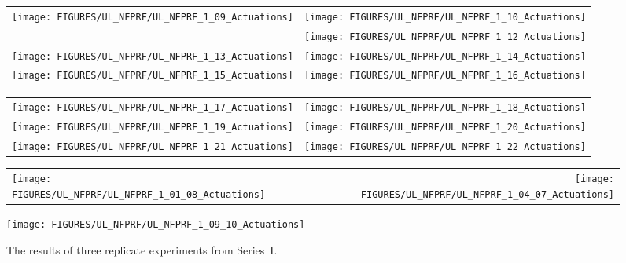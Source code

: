 \begin{figure}[p]
\begin{tabular*}{\textwidth}{l@{\extracolsep{\fill}}r}
\texttt{[image: FIGURES/UL\_NFPRF/UL\_NFPRF\_1\_09\_Actuations]} &
\texttt{[image: FIGURES/UL\_NFPRF/UL\_NFPRF\_1\_10\_Actuations]} \\
&
\texttt{[image: FIGURES/UL\_NFPRF/UL\_NFPRF\_1\_12\_Actuations]} \\
\texttt{[image: FIGURES/UL\_NFPRF/UL\_NFPRF\_1\_13\_Actuations]} &
\texttt{[image: FIGURES/UL\_NFPRF/UL\_NFPRF\_1\_14\_Actuations]} \\
\texttt{[image: FIGURES/UL\_NFPRF/UL\_NFPRF\_1\_15\_Actuations]} &
\texttt{[image: FIGURES/UL\_NFPRF/UL\_NFPRF\_1\_16\_Actuations]} \\
\end{tabular*}
\label{UL_NFPRF_2}
\end{figure}

\begin{figure}[p]
\begin{tabular*}{\textwidth}{l@{\extracolsep{\fill}}r}
\texttt{[image: FIGURES/UL\_NFPRF/UL\_NFPRF\_1\_17\_Actuations]} &
\texttt{[image: FIGURES/UL\_NFPRF/UL\_NFPRF\_1\_18\_Actuations]} \\
\texttt{[image: FIGURES/UL\_NFPRF/UL\_NFPRF\_1\_19\_Actuations]} &
\texttt{[image: FIGURES/UL\_NFPRF/UL\_NFPRF\_1\_20\_Actuations]} \\
\texttt{[image: FIGURES/UL\_NFPRF/UL\_NFPRF\_1\_21\_Actuations]} &
\texttt{[image: FIGURES/UL\_NFPRF/UL\_NFPRF\_1\_22\_Actuations]}
\end{tabular*}
\label{UL_NFPRF_3}
\end{figure}

\begin{figure}[p]
\begin{tabular*}{\textwidth}{l@{\extracolsep{\fill}}r}
\texttt{[image: FIGURES/UL\_NFPRF/UL\_NFPRF\_1\_01\_08\_Actuations]} &
\texttt{[image: FIGURES/UL\_NFPRF/UL\_NFPRF\_1\_04\_07\_Actuations]}
\end{tabular*}
\begin{center}
\texttt{[image: FIGURES/UL\_NFPRF/UL\_NFPRF\_1\_09\_10\_Actuations]}
\end{center}
\caption[The results of three replicate experiments from Series~I.]
{The results of three replicate experiments from Series~I.}
\label{UL_NFPRF_Repeatability}
\end{figure}

